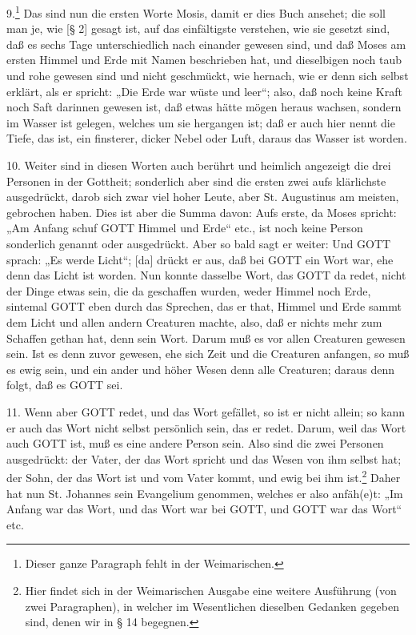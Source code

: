 9.\footnote{Dieser ganze Paragraph fehlt in der Weimarischen.} Das sind nun die ersten Worte Mosis, damit er dies Buch ansehet; die soll man je, wie [§ 2] gesagt ist, auf das einfältigste verstehen, wie sie gesetzt sind, daß es sechs Tage unterschiedlich nach einander gewesen sind, und daß Moses am ersten Himmel und Erde mit Namen beschrieben hat, und dieselbigen noch taub und rohe gewesen sind und nicht geschmückt, wie hernach, wie er denn sich selbst erklärt, als er spricht: „Die Erde war wüste und leer“; also, daß noch keine Kraft noch Saft darinnen gewesen ist, daß etwas hätte mögen heraus wachsen, sondern im Wasser ist gelegen, welches um sie hergangen ist; daß er auch hier nennt die Tiefe, das ist, ein finsterer, dicker Nebel oder Luft, daraus das Wasser ist worden.

10. Weiter sind in diesen Worten auch berührt und heimlich angezeigt die drei Personen in der Gottheit; sonderlich aber sind die ersten zwei aufs klärlichste ausgedrückt, darob sich zwar viel hoher Leute, aber St. Augustinus am meisten, gebrochen haben. Dies ist aber die Summa davon: Aufs erste, da Moses spricht: „Am Anfang schuf GOTT Himmel und Erde“ etc., ist noch keine Person sonderlich genannt oder ausgedrückt. Aber so bald sagt er weiter: Und GOTT sprach: „Es werde Licht“; [da] drückt er aus, daß bei GOTT ein Wort war, ehe denn das Licht ist worden. Nun konnte dasselbe Wort, das GOTT da redet, nicht der Dinge etwas sein, die da geschaffen wurden, weder Himmel noch Erde, sintemal GOTT eben durch das Sprechen, das er that, Himmel und Erde sammt dem Licht und allen andern Creaturen machte, also, daß er nichts mehr zum Schaffen gethan hat, denn sein Wort. Darum muß es vor allen Creaturen gewesen sein. Ist es denn zuvor gewesen, ehe sich Zeit und die Creaturen anfangen, so muß es ewig sein, und ein ander und höher Wesen denn alle Creaturen; daraus denn folgt, daß es GOTT sei.

11. Wenn aber GOTT redet, und das Wort gefället, so ist er nicht allein; so kann er auch das Wort nicht selbst persönlich sein, das er redet. Darum, weil das Wort auch GOTT ist, muß es eine andere Person sein. Also sind die zwei Personen ausgedrückt: der Vater, der das Wort spricht und das Wesen von ihm selbst hat; der Sohn, der das Wort ist und vom Vater kommt, und ewig bei ihm ist.\footnote{Hier findet sich in der Weimarischen Ausgabe eine weitere Ausführung (von zwei Paragraphen), in welcher im Wesentlichen dieselben Gedanken gegeben sind, denen wir in § 14 begegnen.} Daher hat nun St. Johannes sein Evangelium genommen, welches er also anfäh(e)t: „Im Anfang war das Wort, und das Wort war bei GOTT, und GOTT war das Wort“ etc.

